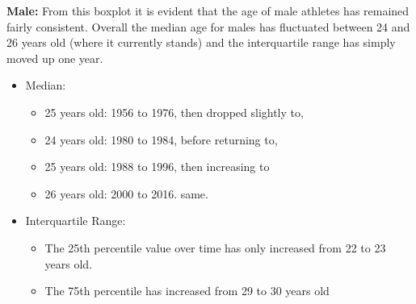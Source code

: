 \documentclass[a4 paper, 12pt]{article}
\begin{document}
        \textbf{Male:} From this boxplot it is evident that the age of male athletes has remained fairly consistent.  Overall the median age for males has fluctuated between 24 and 26 years old (where it currently stands) and the interquartile range has simply moved up one year.
        \begin{itemize}
            \item Median: 
                \begin{itemize}
                    \item 25 years old: 1956 to 1976, then dropped slightly to,
                    \item 24 years old: 1980 to 1984, before returning to,
                    \item 25 years old: 1988 to 1996, then increasing to 
                    \item 26 years old: 2000 to 2016. same.
                \end{itemize}
            \item Interquartile Range:
                \begin{itemize}
                    \item The 25th percentile value over time has only increased from 22 to 23 years old.
                    \item The 75th percentile has increased from 29 to 30 years old
                \end{itemize}
        \end{itemize}
\end{document}
